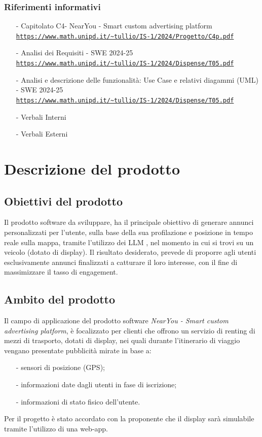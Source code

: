 \documentclass[11pt]{article}
\begin{document}
\begin{justify}
\subsubsection{Riferimenti informativi}
\begin{itemize}
    \item[-] Capitolato C4- NearYou - 
Smart custom advertising platform\\
    \textcolor{blue}{\texttt{\url{https://www.math.unipd.it/~tullio/IS-1/2024/Progetto/C4p.pdf}}}
    \item[-] Analisi dei Requisiti - SWE 2024-25\\
    \textcolor{blue}{\texttt{\url{https://www.math.unipd.it/~tullio/IS-1/2024/Dispense/T05.pdf}}}
    \item[-] Analisi e descrizione delle funzionalità: Use Case e relativi diagammi (UML) - SWE 2024-25\\
    \textcolor{blue}{\texttt{\url{https://www.math.unipd.it/~tullio/IS-1/2024/Dispense/T05.pdf}}}
    \item[-] Verbali Interni
    \item[-] Verbali Esterni
    
    

\end{itemize}

\newpage
\section{Descrizione del prodotto}
\subsection{Obiettivi del prodotto}

Il prodotto software da sviluppare, ha il principale obiettivo di generare annunci personalizzati per l'utente, sulla base della sua profilazione e posizione in tempo reale sulla mappa, tramite l'utilizzo dei LLM , nel momento in cui si trovi su un veicolo (dotato di display). Il risultato desiderato, prevede di proporre agli utenti esclusivamente annunci finalizzati a catturare il loro interesse, con il fine di massimizzare il tasso di engagement.
\subsection{Ambito del prodotto}
Il campo di applicazione del prodotto software \textit{NearYou - 
Smart custom advertising platform}, è focalizzato per clienti che offrono un servizio di renting di mezzi di trasporto, dotati di display, nei quali durante l'itinerario di viaggio vengano presentate pubblicità mirate in base a:
\begin{itemize}
    \item [-] sensori di posizione (GPS);
    \item [-] informazioni date dagli utenti in fase di iscrizione;
    \item [-] informazioni di stato fisico dell’utente.
\end{itemize}
Per il progetto è stato accordato con la proponente che il display sarà simulabile tramite l'utilizzo di una web-app.

\end{justify}
\end{document}
